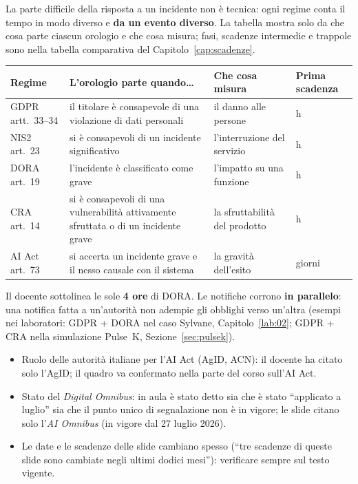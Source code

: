 La parte difficile della risposta a un incidente non è tecnica: ogni regime conta il tempo in modo
diverso e \textbf{da un evento diverso}. La tabella mostra solo da che cosa parte ciascun orologio e che
cosa misura; fasi, scadenze intermedie e trappole sono nella tabella comparativa del
Capitolo~\ref{cap:scadenze}.
\begin{center}
\small
\begin{tabularx}{\linewidth}{>{\raggedright\arraybackslash}p{2.3cm} X >{\raggedright\arraybackslash}p{3.4cm} >{\raggedright\arraybackslash}p{2.2cm}}
\toprule
\textbf{Regime} & \textbf{L'orologio parte quando\ldots} & \textbf{Che cosa misura} & \textbf{Prima scadenza}\\
\midrule
GDPR artt.~33--34 & il titolare è consapevole di una violazione di dati personali & il danno alle
  persone & 72 h\\
NIS2 art.~23 & si è consapevoli di un incidente significativo & l'interruzione del servizio & 24 h\\
DORA art.~19 & l'incidente è classificato come grave & l'impatto su una funzione & 4 h\\
CRA art.~14 & si è consapevoli di una vulnerabilità attivamente sfruttata o di un incidente grave &
  la sfruttabilità del prodotto & 24 h\\
AI Act art.~73 & si accerta un incidente grave e il nesso causale con il sistema & la gravità
  dell'esito & 15 giorni\\
\bottomrule
\end{tabularx}
\end{center}
Il docente sottolinea le sole \textbf{4 ore} di DORA. Le notifiche corrono \textbf{in parallelo}: una
notifica fatta a un'autorità non adempie gli obblighi verso un'altra (esempi nei laboratori:
GDPR + DORA nel caso Sylvane, Capitolo~\ref{lab:02}; GDPR + CRA nella simulazione Pulse~K,
Sezione~\ref{sec:pulsek}).

\begin{verifica}
\begin{itemize}
  \item Ruolo delle autorità italiane per l'AI Act (AgID, ACN): il docente ha citato solo l'AgID; il
    quadro va confermato nella parte del corso sull'AI Act.
  \item Stato del \emph{Digital Omnibus}: in aula è stato detto sia che è stato ``applicato a luglio''
    sia che il punto unico di segnalazione non è in vigore; le slide citano solo l'\emph{AI Omnibus}
    (in vigore dal 27 luglio 2026).
  \item Le date e le scadenze delle slide cambiano spesso (``tre scadenze di queste slide sono cambiate
    negli ultimi dodici mesi''): verificare sempre sul testo vigente.
\end{itemize}
\end{verifica}
